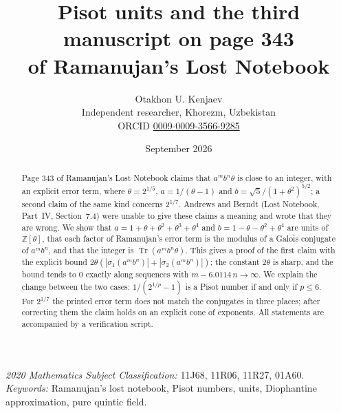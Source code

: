 \documentclass[11pt]{article}
\title{Pisot units and the third manuscript on page 343\\ of Ramanujan's Lost Notebook}
\author{Otakhon U. Kenjaev\\ \small Independent researcher, Khorezm, Uzbekistan\\
\small ORCID \href{https://orcid.org/0009-0009-3566-9285}{0009-0009-3566-9285}}
\date{September 2026}
\theoremstyle{remark}
\newcommand{\Tr}{\operatorname{Tr}}
\newcommand{\Z}{\mathbb{Z}}
\begin{document}
\maketitle

\begin{abstract}
Page 343 of Ramanujan's Lost Notebook claims that $a^m b^n\theta$ is close to an integer, with an explicit error term, where
$\theta=2^{1/5}$, $a=1/(\theta-1)$ and $b=\sqrt5/(1+\theta^2)^{5/2}$; a second claim of the same kind concerns $2^{1/7}$. Andrews and
Berndt (Lost Notebook, Part~IV, Section~7.4) were unable to give these claims a meaning and wrote that they are wrong. We show that
$a=1+\theta+\theta^2+\theta^3+\theta^4$ and $b=1-\theta-\theta^2+\theta^4$ are units of $\Z[\theta]$, that each factor of Ramanujan's
error term is the modulus of a Galois conjugate of $a^mb^n$, and that the integer is $\Tr(a^mb^n\theta)$. This gives a proof of the
first claim with the explicit bound $2\theta(|\sigma_1(a^mb^n)|+|\sigma_2(a^mb^n)|)$; the constant $2\theta$ is sharp, and the bound
tends to $0$ exactly along sequences with $m-6.0114\,n\to\infty$. We explain the change between the two cases: $1/(2^{1/p}-1)$ is a Pisot number if and only
if $p\le6$. For $2^{1/7}$ the printed error term does not match the conjugates in three places; after correcting them the claim holds
on an explicit cone of exponents. All statements are accompanied by a verification script.
\end{abstract}

\noindent\textit{2020 Mathematics Subject Classification:} 11J68, 11R06, 11R27, 01A60.\\
\textit{Keywords:} Ramanujan's lost notebook, Pisot numbers, units, Diophantine approximation, pure quintic field.
\end{document}
